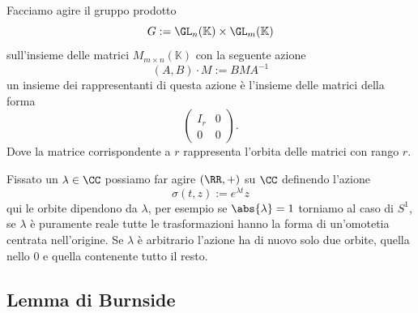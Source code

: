 \documentclass[11pt]{scrartcl}
\begin{document}
	\begin{example}
		Facciamo agire il gruppo prodotto
		$$G:=\GL_n(\mathbb{K})\times \GL_m(\mathbb{K})$$
		sull'insieme delle matrici $M_{m\times n}(\mathbb{K})$ con la seguente azione
		$$(A,B)\cdot M:=BMA^{-1}$$
		un insieme dei rappresentanti di questa azione è l'insieme delle matrici della forma
		$$\left(\begin{array}{c|c}
			I_r & 0 \\
			\hline
			0 & 0
		\end{array}\right).$$
		Dove la matrice corrispondente a $r$ rappresenta l'orbita delle matrici con rango $r$.
	\end{example}
	\begin{example}
		Fissato un $\lambda\in\CC$ possiamo far agire $(\RR,+)$ su $\CC$ definendo l'azione
		$$\sigma(t,z):=e^{\lambda t}z$$
		qui le orbite dipendono da $\lambda$, per esempio se $\abs{\lambda}=1$ torniamo al caso di $S^1$, se $\lambda$ è puramente reale tutte le trasformazioni hanno la forma di un'omotetia centrata nell'origine. Se $\lambda$ è arbitrario l'azione ha di nuovo solo due orbite, quella nello $0$ e quella contenente tutto il resto.
	\end{example}
	
	\subsection{Lemma di Burnside}
	
\end{document}
